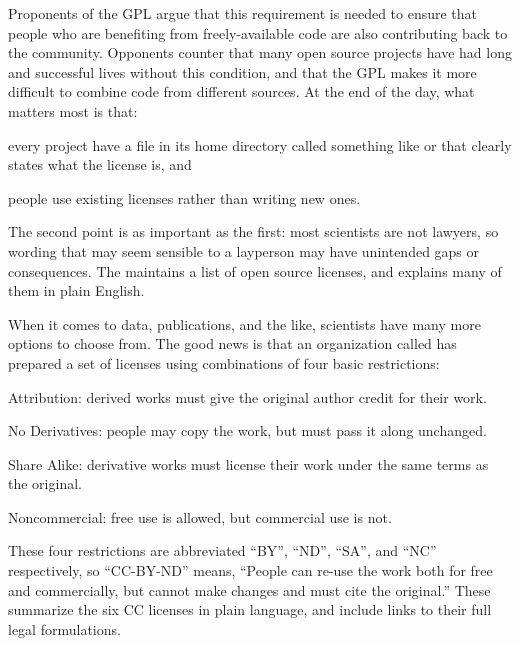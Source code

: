 Proponents of the GPL argue that this requirement is needed to ensure
that people who are benefiting from freely-available code are also
contributing back to the community. Opponents counter that many open
source projects have had long and successful lives without this
condition, and that the GPL makes it more difficult to combine code from
different sources. At the end of the day, what matters most is that:

\begin{swcenumerate}
\item
  every project have a file in its home directory called something like
   or  that clearly states what the
  license is, and
\item
  people use existing licenses rather than writing new ones.
\end{swcenumerate}

The second point is as important as the first: most scientists are not
lawyers, so wording that may seem sensible to a layperson may have
unintended gaps or consequences. The  maintains a list of open source licenses, and
 explains many of them in
plain English.

When it comes to data, publications, and the like, scientists have many
more options to choose from. The good news is that an organization
called  has prepared
a set of licenses using combinations of four basic restrictions:

\begin{swcitemize}
\item
  Attribution: derived works must give the original author credit for
  their work.
\item
  No Derivatives: people may copy the work, but must pass it along
  unchanged.
\item
  Share Alike: derivative works must license their work under the same
  terms as the original.
\item
  Noncommercial: free use is allowed, but commercial use is not.
\end{swcitemize}

These four restrictions are abbreviated ``BY'', ``ND'', ``SA'', and
``NC'' respectively, so ``CC-BY-ND'' means, ``People can re-use the work
both for free and commercially, but cannot make changes and must cite
the original.'' These  summarize the six CC licenses in plain language, and
include links to their full legal formulations.

